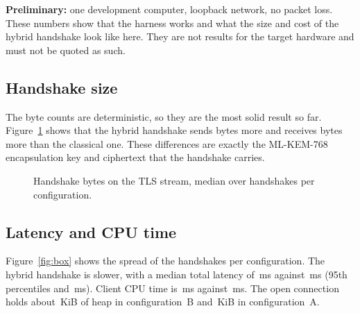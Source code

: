 \documentclass[11pt,a4paper]{article}
\begin{document}
\textbf{Preliminary:} one development computer, loopback network, no packet loss. These
numbers show that the harness works and what the size and cost of the hybrid handshake look like
here. They are not results for the target hardware and must not be quoted as such.

\subsection{Handshake size}

The byte counts are deterministic, so they are the most solid result so far. Figure~\ref{fig:bytes}
shows that the hybrid handshake sends \DeltaTx{} bytes more and receives \DeltaRx{} bytes more than
the classical one. These differences are exactly the ML-KEM-768 encapsulation key and ciphertext
that the handshake carries.

\begin{figure}[h]
\centering
{}
\caption{Handshake bytes on the TLS stream, median over \NPerConfig{} handshakes per configuration.}
\label{fig:bytes}
\end{figure}

\subsection{Latency and CPU time}

Figure~\ref{fig:box} shows the spread of the \NPerConfig{} handshakes per configuration. The
hybrid handshake is slower, with a median total latency of \MedTotB{}\,ms against \MedTotA{}\,ms
(95th percentiles \PNineFiveTotB{} and \PNineFiveTotA{}\,ms). Client CPU time is \MedCpuB{}\,ms
against \MedCpuA{}\,ms. The open connection holds about \MedHeapB{}\,KiB of heap in configuration~B
and \MedHeapA{}\,KiB in configuration~A.
\end{document}
